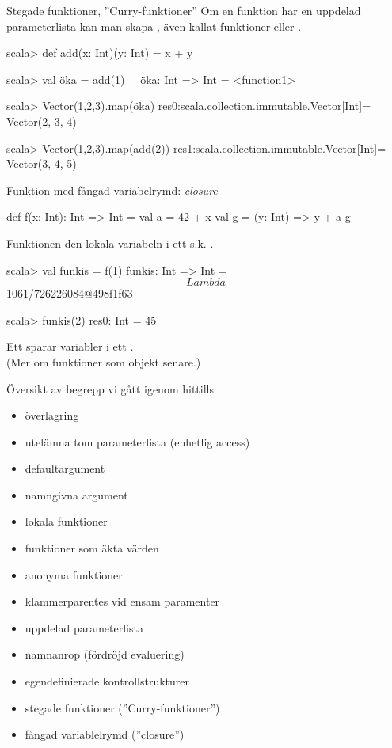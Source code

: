 \begin{Slide}{Stegade funktioner, ''Curry-funktioner''}
Om en funktion har en uppdelad parameterlista kan man skapa , även kallat  funktioner  eller .
\begin{REPLnonum}
scala> def add(x: Int)(y: Int) = x + y

scala> val öka = add(1) _
öka: Int => Int = <function1>

scala> Vector(1,2,3).map(öka)
res0:scala.collection.immutable.Vector[Int]= Vector(2, 3, 4)

scala> Vector(1,2,3).map(add(2))
res1:scala.collection.immutable.Vector[Int]= Vector(3, 4, 5)
\end{REPLnonum}
\end{Slide}


\begin{Slide}{Funktion med fångad variabelrymd: \textit{closure}}
\begin{Code}
def f(x: Int): Int => Int = {
  val a = 42 + x
  val g = (y: Int) => y + a
  g
}
\end{Code}
Funktionen   den lokala variabeln  i ett s.k. .
\pause
\begin{REPLnonum}
scala> val funkis = f(1)
funkis: Int => Int = $$Lambda$$1061/726226084@498f1f63

scala> funkis(2)
res0: Int = 45
\end{REPLnonum}
\pause
Ett  sparar variabler i ett . \\
(Mer om funktioner som objekt senare.)
\end{Slide}


\begin{Slide}{Översikt av begrepp vi gått igenom hittills}
\begin{itemize}
\item överlagring
\item utelämna tom parameterlista (enhetlig access)
\item defaultargument
\item namngivna argument
\item lokala funktioner
\item funktioner som äkta värden
\item anonyma funktioner
\item klammerparentes vid ensam paramenter
\item uppdelad parameterlista
\item namnanrop (fördröjd evaluering)
\item egendefinierade kontrollstrukturer
\item stegade funktioner (''Curry-funktioner'')
\item fångad variablelrymd (''closure'')
\end{itemize}
\end{Slide}

